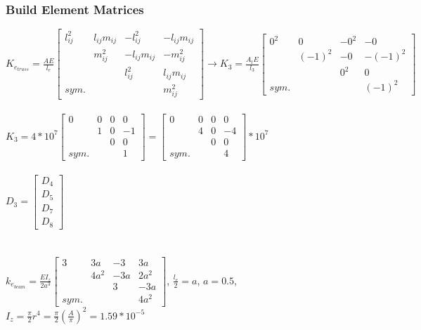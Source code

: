 \documentclass{article}
\begin{document}
\subsubsection*{Build Element Matrices}
$K_{e_{truss}}=\frac{AE}{l_e}
\begin{bmatrix}
    l_{ij}^2 & l_{ij}m_{ij} & -l_{ij}^2 & -l_{ij}m_{ij} \\
    & m_{ij}^2 & -l_{ij}m_{ij} & -m_{ij}^2 \\
    & & l_{ij}^2 & l_{ij}m_{ij} \\
    sym. & & & m_{ij}^2
\end{bmatrix}\rightarrow K_{3}=\frac{A_tE}{l_3}
\begin{bmatrix}
    0^2 & 0 & -0^2 & -0 \\
    & (-1)^2 & -0 & -(-1)^2 \\
    & & 0^2 & 0 \\
    sym. & & & (-1)^2
\end{bmatrix}$ \\\\
$K_3=4*10^7\begin{bmatrix}
    0 & 0 & 0 & 0 \\
    & 1 & 0 & -1 \\
    & & 0 & 0 \\
    sym. & & & 1
\end{bmatrix}=\begin{bmatrix}
    0 & 0 & 0 & 0 \\
    & 4 & 0 & -4 \\
    & & 0 & 0 \\
    sym. & & & 4
\end{bmatrix}*10^7$ \\\\
$D_3=\begin{bmatrix}
    D_4 \\ D_5 \\ D_7 \\ D_8
\end{bmatrix}$\\\\\\
$k_{e_{beam}}=\frac{EI_z}{2a^3}\begin{bmatrix}
    3 & 3a & -3 & 3a \\
    & 4a^2 & -3a & 2a^2 \\
    & & 3 & -3a \\
    sym. & & & 4a^2
\end{bmatrix}$, \quad $\frac{l_e}{2}=a$, \quad $a=0.5$, \quad
$I_z=\frac{\pi}{2}r^4=\frac{\pi}{2}(\frac{A}{\pi})^2=1.59*10^{-5}$ \\\\\\
\end{document}
